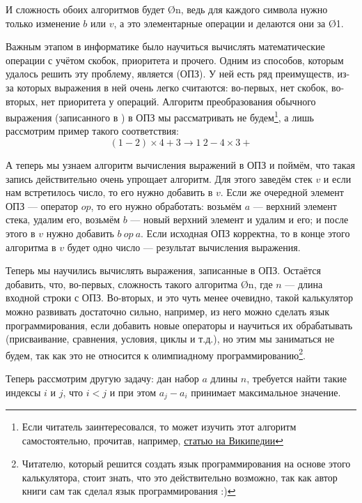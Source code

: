И сложность обоих алгоритмов будет \O{n}, ведь для каждого символа нужно только изменение $b$ или $v$, а это элементарные операции и делаются они за \O{1}.


Важным этапом в информатике было научиться вычислять математические операции с учётом скобок, приоритета и прочего. Одним из способов, которым удалось решить эту проблему, является  (ОПЗ). У ней есть ряд преимуществ, из-за которых выражения в ней очень легко считаются: во-первых, нет скобок, во-вторых, нет приоритета у операций. Алгоритм преобразования обычного выражения (записанного в ) в ОПЗ мы рассматривать не будем\footnote{Если читатель заинтересовался, то может изучить этот алгоритм самостоятельно, прочитав, например, \href{https://ru.wikipedia.org/wiki/\%D0\%9E\%D0\%B1\%D1\%80\%D0\%B0\%D1\%82\%D0\%BD\%D0\%B0\%D1\%8F_\%D0\%BF\%D0\%BE\%D0\%BB\%D1\%8C\%D1\%81\%D0\%BA\%D0\%B0\%D1\%8F_\%D0\%B7\%D0\%B0\%D0\%BF\%D0\%B8\%D1\%81\%D1\%8C}{статью на Википедии}}, а лишь рассмотрим пример такого соответствия:
$$(1 - 2) \times 4 + 3 \to 1\ 2 - 4 \times 3 +$$

А теперь мы узнаем алгоритм вычисления выражений в ОПЗ и поймём, что такая запись действительно очень упрощает алгоритм. Для этого заведём стек $v$ и если нам встретилось число, то его нужно добавить в $v$. Если же очередной элемент ОПЗ — оператор $op$, то его нужно обработать: возьмём $a$ — верхний элемент стека, удалим его, возьмём $b$ — новый верхний элемент и удалим и его; и после этого в $v$ нужно добавить $b\ op\ a$. Если исходная ОПЗ корректна, то в конце этого алгоритма в $v$ будет одно число — результат вычисления выражения.

Теперь мы научились вычислять выражения, записанные в ОПЗ. Остаётся добавить, что, во-первых, сложность такого алгоритма \O{n}, где $n$ — длина входной строки с ОПЗ. Во-вторых, и это чуть менее очевидно, такой калькулятор можно развивать достаточно сильно, например, из него можно сделать язык программирования, если добавить новые операторы и научиться их обрабатывать (присваивание, сравнения, условия, циклы и т.д.), но этим мы заниматься не будем, так как это не относится к олимпиадному программированию\footnote{Читателю, который решится создать язык программирования на основе этого калькулятора, стоит знать, что это действительно возможно, так как автор книги сам так сделал язык программирования :)}.


Теперь рассмотрим другую задачу: дан набор $a$ длины $n$, требуется найти такие индексы $i$ и $j$, что $i < j$ и при этом $a_j - a_i$ принимает максимальное значение.

